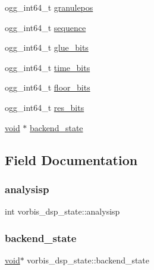 \begin{DoxyCompactItemize}
\item 
ogg\+\_\+int64\+\_\+t \hyperlink{structvorbis__dsp__state_af84a7a4855db2744d1ef73f48cb6b352}{granulepos}
\item 
ogg\+\_\+int64\+\_\+t \hyperlink{structvorbis__dsp__state_a38a8b96daf9d16d8cce0522e203635a6}{sequence}
\item 
ogg\+\_\+int64\+\_\+t \hyperlink{structvorbis__dsp__state_ae2d065c13e84870fd889c82cd2e7a04f}{glue\+\_\+bits}
\item 
ogg\+\_\+int64\+\_\+t \hyperlink{structvorbis__dsp__state_adef49c2187f4ed3381973274e1b01151}{time\+\_\+bits}
\item 
ogg\+\_\+int64\+\_\+t \hyperlink{structvorbis__dsp__state_a2913a4ebbbd6721c53264a2ca8466cea}{floor\+\_\+bits}
\item 
ogg\+\_\+int64\+\_\+t \hyperlink{structvorbis__dsp__state_a3091c7fac6b57c54027c32931a7e6ee0}{res\+\_\+bits}
\item 
\hyperlink{png_8h_ac9c84fa68bbad002983e35ce3663c686}{void} $\ast$ \hyperlink{structvorbis__dsp__state_a97ff4df8d289e5e3968029e47d7f8162}{backend\+\_\+state}
\end{DoxyCompactItemize}


\subsection{Field Documentation}
\mbox{\label{structvorbis__dsp__state_a9b983a6901a311f2d354f2b6c51cf93b}} 
\subsubsection{\texorpdfstring{analysisp}{analysisp}}
{\footnotesize\ttfamily int vorbis\+\_\+dsp\+\_\+state\+::analysisp}

\mbox{\label{structvorbis__dsp__state_a97ff4df8d289e5e3968029e47d7f8162}} 
\subsubsection{\texorpdfstring{backend\+\_\+state}{backend\_state}}
{\footnotesize\ttfamily \hyperlink{png_8h_ac9c84fa68bbad002983e35ce3663c686}{void}$\ast$ vorbis\+\_\+dsp\+\_\+state\+::backend\+\_\+state}

